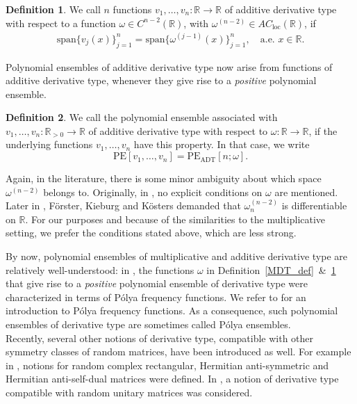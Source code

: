 \documentclass[a4paper,12pt,oneside]{article}
\theoremstyle{definition}
\newtheorem{defi}{Definition}[section]
\newcommand{\R}{\mathbb{R}}
\newcommand{\om}{\omega}
\newcommand{\spn}[1]{\text{span}\{#1\}}
\begin{document}
\begin{defi}\label{ADT_def}
      We call $n$ functions $v_1,\dots,v_n:\R\to\R$ of additive derivative type with respect to a function $\om\in C^{n-2}(\R)$, with $\om^{(n-2)}\in AC_{\text{loc}}(\R)$, if    
      \begin{align*}
        \spn{v_j(x)}_{j=1}^n = \spn{\om^{(j-1)}(x)}_{j=1}^n, \quad \text{a.e. } x\in\R.
    \end{align*}
\end{defi}

Polynomial ensembles of additive derivative type now arise from functions of additive derivative type, whenever they give rise to a \textit{positive} polynomial ensemble. 

\begin{defi}\label{PE_ADT_def}
      We call the polynomial ensemble associated with $v_1,\dots,v_n:\R_{>0}\to\R$ of additive derivative type with respect to $\om:\R\to\R$, if the underlying functions $v_1,\dots,v_n$ have this property. In that case, we write 
        $$\text{PE}[v_1,\dots,v_n] = \text{PE}_{\text{ADT}}[n;\om].$$
\end{defi}

Again, in the literature, there is some minor ambiguity about which space $\om^{(n-2)}$ belongs to. Originally, in \cite{KR:add_DT}, no explicit conditions on $\om$ are mentioned. Later in \cite{FKK:PolyaE}, Förster, Kieburg and Kösters demanded that $\om_n^{(n-2)}$ is differentiable on $\R$. For our purposes and because of the similarities to the multiplicative setting, we prefer the conditions stated above, which are less strong.
\medbreak

By now, polynomial ensembles of multiplicative and additive derivative type are relatively well-understood: in \cite{FKK:PolyaE}, the functions $\om$ in Definition~\ref{MDT_def}~\&~\ref{ADT_def} that give rise to a \textit{positive} polynomial ensemble of derivative type were characterized in terms of Pólya frequency functions. We refer to \cite[Ch. 7]{Karlin} for an introduction to Pólya frequency functions. As a consequence, such polynomial ensembles of derivative type are sometimes called Pólya ensembles. \\
Recently, several other notions of derivative type, compatible with other symmetry classes of random matrices, have been introduced as well. For example in \cite{FKK:PolyaE}, notions for random complex rectangular, Hermitian anti-symmetric and Hermitian anti-self-dual matrices were defined. In \cite{KLZF:cyclic_Polya}, a notion of derivative type compatible with random unitary matrices was considered.
\end{document}
